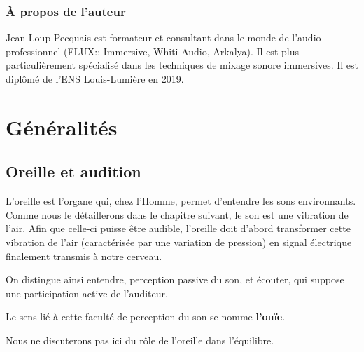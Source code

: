 \documentclass[
  letterpaper,
  DIV=11,
  numbers=noendperiod]{scrreprt}
\begin{document}
\hypertarget{uxe0-propos-de-lauteur}{%
\section*{À propos de l'auteur}\label{uxe0-propos-de-lauteur}}


Jean-Loup Pecquais est formateur et consultant dans le monde de l'audio
professionnel (FLUX:: Immersive, Whiti Audio, Arkalya). Il est plus
particulièrement spécialisé dans les techniques de mixage sonore
immersives. Il est diplômé de l'ENS Louis-Lumière en 2019.

\part{Généralités}

\hypertarget{oreille-et-audition}{%
\chapter{Oreille et audition}\label{oreille-et-audition}}

L'oreille est l'organe qui, chez l'Homme, permet d'entendre les sons
environnants. Comme nous le détaillerons dans le chapitre suivant, le
son est une vibration de l'air. Afin que celle-ci puisse être audible,
l'oreille doit d'abord transformer cette vibration de l'air
(caractérisée par une variation de pression) en signal électrique
finalement transmis à notre cerveau.

On distingue ainsi entendre, perception passive du son, et écouter, qui
suppose une participation active de l'auditeur.

Le sens lié à cette faculté de perception du son se nomme
\textbf{l'ouïe}.

\begin{tcolorbox}[enhanced jigsaw, leftrule=.75mm, arc=.35mm, bottomtitle=1mm, colback=white, colbacktitle=quarto-callout-note-color!10!white, opacityback=0, left=2mm, rightrule=.15mm, opacitybacktitle=0.6, breakable, toptitle=1mm, titlerule=0mm, bottomrule=.15mm, toprule=.15mm, coltitle=black, title=\textcolor{quarto-callout-note-color}{\faInfo}\hspace{0.5em}{Note}]

Nous ne discuterons pas ici du rôle de l'oreille dans l'équilibre.

\end{tcolorbox}
\end{document}
